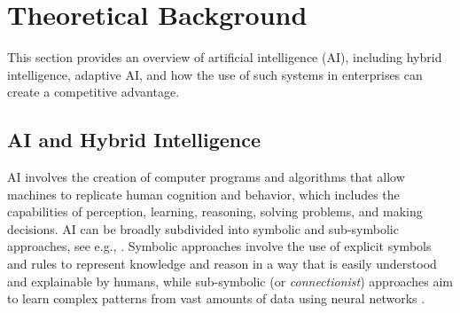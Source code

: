 \section{Theoretical Background}
\label{sec:literature}

This section provides an overview of artificial intelligence (AI), including hybrid intelligence, adaptive AI,
and how the use of such systems in enterprises can create a competitive advantage.

\subsection{AI and Hybrid Intelligence}

AI involves the creation of computer programs and algorithms that allow machines to replicate human cognition and behavior,
which includes the capabilities of perception, learning, reasoning, solving problems, and making decisions. AI can be broadly
subdivided into symbolic and sub-symbolic approaches, see e.g., \cite{eliasmithSymbolicSubsymbolic2006}. Symbolic approaches
involve the use of explicit symbols and rules to represent knowledge and reason in a way that is easily understood and explainable
by humans, while sub-symbolic (or \textit{connectionist}) approaches aim to learn complex patterns from vast amounts of data
using neural networks \citep{ilkouSymbolicVsSubsymbolic2020}.

